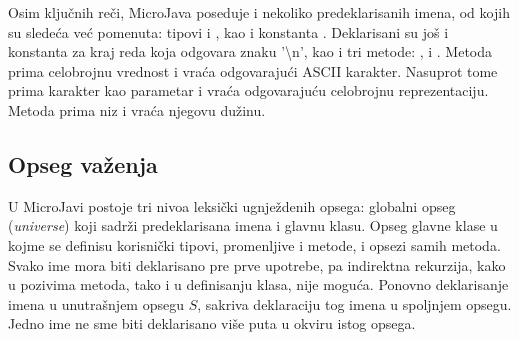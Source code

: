 Osim ključnih reči, MicroJava poseduje i nekoliko predeklarisanih imena, od kojih su sledeća već pomenuta: 
	tipovi  i , kao i konstanta . 
Deklarisani su još i konstanta za kraj reda  koja odgovara znaku '\textbackslash n', 
	kao i tri metode: ,  i . 
Metoda   prima celobrojnu vrednost i vraća odgovarajući ASCII karakter. 
Nasuprot tome  prima karakter kao parametar i vraća odgovarajuću celobrojnu reprezentaciju. 
Metoda  prima niz i vraća njegovu dužinu. 

\subsection*{Opseg važenja}

U MicroJavi postoje tri nivoa leksički ugnježdenih opsega: globalni opseg (\textit{universe}) koji sadrži predeklarisana imena i glavnu klasu. 
Opseg glavne klase u kojme se definisu korisnički tipovi, promenljive i metode, i opsezi samih metoda. 
Svako ime mora biti deklarisano pre prve upotrebe, pa indirektna rekurzija, kako u pozivima metoda, tako i u definisanju klasa, nije moguća. 
Ponovno deklarisanje imena u unutrašnjem opsegu $S$, sakriva deklaraciju tog imena u spoljnjem opsegu. 
Jedno ime ne sme biti deklarisano više puta u okviru istog opsega.
